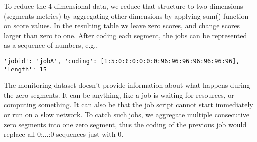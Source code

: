 \documentclass{jhps}
\begin{document}

To reduce the 4-dimensional data, we reduce that structure to two dimensions (segments metrics) by aggregating other dimensions by applying sum() function on score values.
In the resulting table we leave zero scores, and change scores larger than zero to one.
After coding each segment, the jobs can be represented as a sequence of numbers, e.g.,
\begin{lstlisting}
'jobid': 'jobA', 'coding': [1:5:0:0:0:0:0:0:96:96:96:96:96:96:96], 'length': 15
\end{lstlisting}
The monitoring dataset doesn't provide information about what happens during the zero segments.
It can be anything, like a job is waiting for resources, or computing something.
It can also be that the job script cannot start immediately or run on a slow network.
To catch such jobs, we aggregate multiple consecutive zero segments into one zero segment, thus the coding of the previous job would replace all 0:...:0 sequences just with 0.
\end{document}
